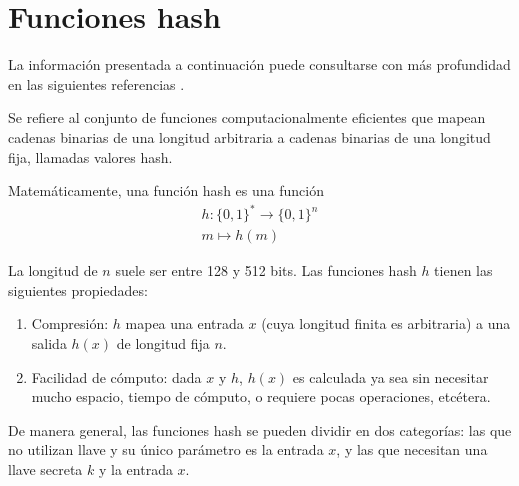 %
%

\section{Funciones hash}
La información presentada a continuación puede consultarse con más profundidad
en las siguientes referencias
\cite{hash_hussein, menezes, DBLP:series/isc/DelfsK07, hash_gupta}.

Se refiere al conjunto de funciones computacionalmente eficientes que
mapean cadenas binarias de una longitud arbitraria a cadenas binarias
de una longitud fija, llamadas valores hash.

Matemáticamente, una función hash es una función
\begin{equation}
  \label{funcion_hash_def}
  \begin{split}
    h: \{0, 1\}^* \longrightarrow \{0,1\}^n \\
    m \longmapsto h(m)
  \end{split}
\end{equation}

La longitud de $n$ suele ser entre 128 y 512 bits. Las funciones hash
$h$ tienen las siguientes propiedades:
\begin{enumerate}
  \item Compresión: $h$ mapea una entrada $x$ (cuya longitud
    finita es arbitraria) a una salida $h(x)$ de longitud fija $n$.
  \item Facilidad de cómputo: dada $x$ y $h$, $h(x)$ es
    calculada ya sea sin necesitar mucho espacio, tiempo de cómputo, o
    requiere pocas operaciones, etcétera.
\end{enumerate}

De manera general, las funciones hash se pueden dividir en dos
categorías: las que no utilizan llave y su único parámetro es la entrada
$x$, y las que necesitan una llave secreta $k$ y la entrada $x$.

